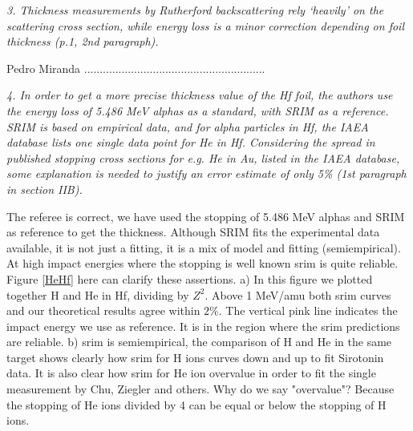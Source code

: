 \documentclass[a4paper,10pt]{article}
\begin{document}
\vspace{0.35cm}
\textsl{3. Thickness measurements by Rutherford backscattering rely 
‘heavily’ on the scattering cross section, while energy loss is a minor 
correction depending on foil thickness (p.1, 2nd paragraph).}

\vspace{0.1cm}
{\color{red} Pedro Miranda ..........................................................}
\vspace{0.2cm}

\vspace{0.25cm}
\textsl{4. In order to get a more precise thickness value of the Hf 
foil, the authors use the energy loss of 5.486 MeV alphas as a standard, 
with SRIM as a reference. SRIM is based on empirical data, and for alpha 
particles in Hf, the IAEA database lists one single data point for He 
in Hf. Considering the spread in published stopping cross sections for 
e.g. He in Au, listed in the IAEA database, some explanation is needed 
to justify an error estimate of only 5\% (1st paragraph in section 
IIB).}

\vspace{0.1cm}
{\color{red} The referee is correct, we have used the stopping of 5.486 MeV alphas and SRIM as reference to get the thickness. Although SRIM fits the experimental data available, it is not just a fitting, it is a mix of model and fitting (semiempirical). At high impact energies where the stopping is well known srim is quite reliable. Figure \ref{HeHf} here can clarify these assertions. 
a) In this figure we plotted together H and He in Hf, dividing by $Z^2$. Above 1 MeV/amu both srim curves and our theoretical results agree within $2\%$. The vertical pink line indicates the impact energy we use as reference. It is in the region where the srim predictions are reliable. b) srim is semiempirical, the comparison of H and He in the same target shows clearly how srim for H ions curves down and up to fit Sirotonin data. It is also clear how srim for He ion overvalue in order to fit the single measurement by Chu, Ziegler and others. Why do we say "overvalue"? Because the stopping of He ions divided by 4 can be equal or below the stopping of H ions. }
\end{document}
